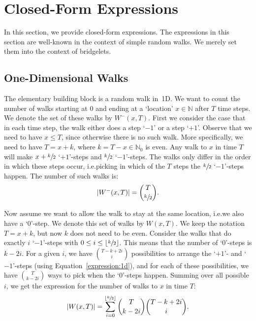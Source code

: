 \documentclass[11pt,a4paper,twoside,british]{article}
\begin{document}
\section{Closed-Form Expressions}\label{sec:closed}
In this section, we provide closed-form expressions.
The expressions in this section are well-known in the context of simple random
walks.
We merely set them into the context of bridgelets.

\subsection{One-Dimensional Walks}
The elementary building block is a random walk in~1D.
We want to count the number of walks starting at $0$ and ending at a `location'
$x \in \mathbb{N}$ after $T$ time steps.
We denote the set of these walks by $W^-(x, T)$.
First we consider the case that in each time step, the walk either does a step
`$-1$' or a step `$+1$'.
Observe that we need to have $x \leq T$, since otherwise there is no such walk.
More specifically, we need to have $T = x + k$, where
$k = T - x \in \mathbb{N}_0$ is even.
Any walk to $x$ in time $T$ will make $x + \sfrac{k}{2}$ `$+1$'-steps and
$\sfrac{k}{2}$ `$-1$'-steps.
The walks only differ in the order in which these steps occur, i.e.\@ picking in
which of the $T$ steps the $\sfrac{k}{2}$ `$-1$'-steps happen.
The number of such walks is:
\begin{equation}
\lvert W^-(x, T)\rvert = \binom{T}{\sfrac{k}{2}}.\label{expression:1d}
\end{equation}

Now assume we want to allow the walk to stay at the same location, i.e.\@ we
also have a `$0$'-step.
We denote this set of walks by $W(x, T)$.
We keep the notation $T = x + k$, but now $k$ does not need to be even.
Consider the walks that do exactly $i$ `$-1$'-steps with
$0 \leq i \leq \lfloor\sfrac{k}{2}\rfloor$.
This means that the number of `$0$'-steps is $k - 2i$.
For a given $i$, we have $\binom{T - k + 2i}{i}$ possibilities to arrange the
`$+1$'- and `$-1$'-steps (using Equation~\ref{expression:1d}), and for each of
these possibilities, we have $\binom{T}{k - 2i}$ ways to pick when the
`$0$'-steps happen.
Summing over all possible $i$, we get the expression for the number of walks to
$x$ in time $T$:
\begin{equation}
\lvert W(x, T)\rvert = \sum_{i = 0}^{\lfloor\sfrac{k}{2}\rfloor}
\binom{T}{k - 2i}\binom{T - k + 2i}{i}.\label{expression:1dzero}
\end{equation}
\end{document}
